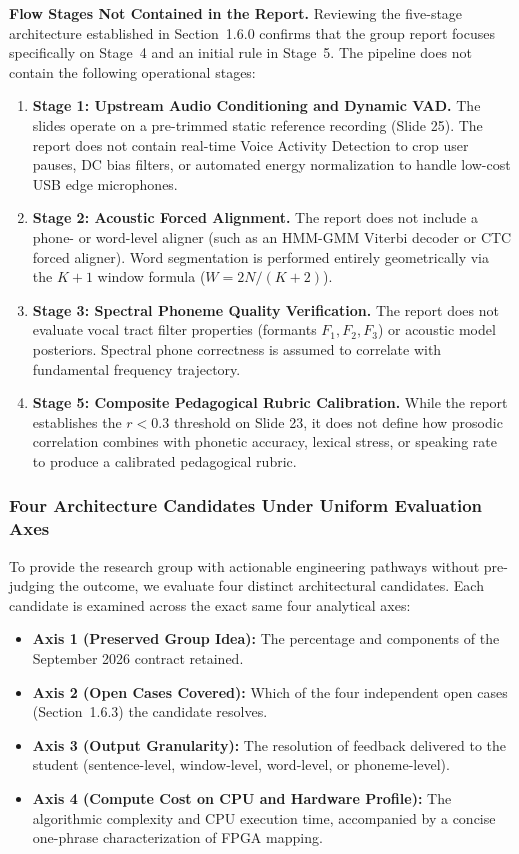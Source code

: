 \documentclass[11pt,a4paper]{article}
\begin{document}
\textbf{Flow Stages Not Contained in the Report.} Reviewing the five-stage architecture established in Section~1.6.0 confirms that the group report focuses specifically on Stage~4 and an initial rule in Stage~5. The pipeline does not contain the following operational stages:
\begin{enumerate}
    \item \textbf{Stage 1: Upstream Audio Conditioning and Dynamic VAD.} The slides operate on a pre-trimmed static reference recording (Slide 25). The report does not contain real-time Voice Activity Detection to crop user pauses, DC bias filters, or automated energy normalization to handle low-cost USB edge microphones.
    \item \textbf{Stage 2: Acoustic Forced Alignment.} The report does not include a phone- or word-level aligner (such as an HMM-GMM Viterbi decoder or CTC forced aligner). Word segmentation is performed entirely geometrically via the $K+1$ window formula ($W = 2N/(K+2)$).
    \item \textbf{Stage 3: Spectral Phoneme Quality Verification.} The report does not evaluate vocal tract filter properties (formants $F_1, F_2, F_3$) or acoustic model posteriors. Spectral phone correctness is assumed to correlate with fundamental frequency trajectory.
    \item \textbf{Stage 5: Composite Pedagogical Rubric Calibration.} While the report establishes the $r < 0.3$ threshold on Slide 23, it does not define how prosodic correlation combines with phonetic accuracy, lexical stress, or speaking rate to produce a calibrated pedagogical rubric.
\end{enumerate}

\subsubsection*{Four Architecture Candidates Under Uniform Evaluation Axes}

To provide the research group with actionable engineering pathways without pre-judging the outcome, we evaluate four distinct architectural candidates. Each candidate is examined across the exact same four analytical axes:
\begin{itemize}
    \item \textbf{Axis 1 (Preserved Group Idea):} The percentage and components of the September 2026 contract retained.
    \item \textbf{Axis 2 (Open Cases Covered):} Which of the four independent open cases (Section~1.6.3) the candidate resolves.
    \item \textbf{Axis 3 (Output Granularity):} The resolution of feedback delivered to the student (sentence-level, window-level, word-level, or phoneme-level).
    \item \textbf{Axis 4 (Compute Cost on CPU and Hardware Profile):} The algorithmic complexity and CPU execution time, accompanied by a concise one-phrase characterization of FPGA mapping.
\end{itemize}
\end{document}
